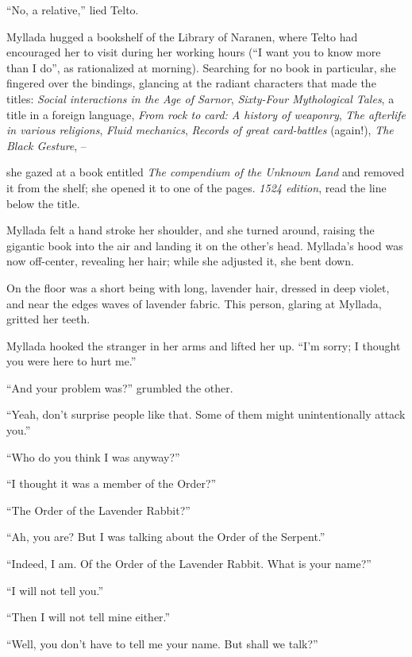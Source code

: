 ``No, a relative,'' lied Telto.

\centeredstars

Myllada hugged a bookshelf of the Library of Naranen, where Telto had encouraged her to visit during her working hours (``I want you to know more than I do'', as rationalized at morning). Searching for no book in particular, she fingered over the bindings, glancing at the radiant characters that made the titles: \emph{Social interactions in the Age of Sarnor}, \emph{Sixty-Four Mythological Tales}, a title in a foreign language, \emph{From rock to card: A history of weaponry}, \emph{The afterlife in various religions}, \emph{Fluid mechanics}, \emph{Records of great card-battles} (again!), \emph{The Black Gesture}, --

she gazed at a book entitled \emph{The compendium of the Unknown Land} and removed it from the shelf; she opened it to one of the pages. \emph{1524 edition}, read the line below the title.

Myllada felt a hand stroke her shoulder, and she turned around, raising the gigantic book into the air and landing it on the other's head. Myllada's hood was now off-center, revealing her hair; while she adjusted it, she bent down.

On the floor was a short being with long, lavender hair, dressed in deep violet, and near the edges waves of lavender fabric. This person, glaring at Myllada, gritted her teeth.

Myllada hooked the stranger in her arms and lifted her up. ``I'm sorry; I thought you were here to hurt me.''

``And your problem was?'' grumbled the other.

``Yeah, don't surprise people like that. Some of them might unintentionally attack you.''

``Who do you think I was anyway?''

``I thought it was a member of the Order?''

``The Order of the Lavender Rabbit?''

``Ah, you are? But I was talking about the Order of the Serpent.''

``Indeed, I am. Of the Order of the Lavender Rabbit. What is your name?''

``I will not tell you.''

``Then I will not tell mine either.''

``Well, you don't have to tell me your name. But shall we talk?''

